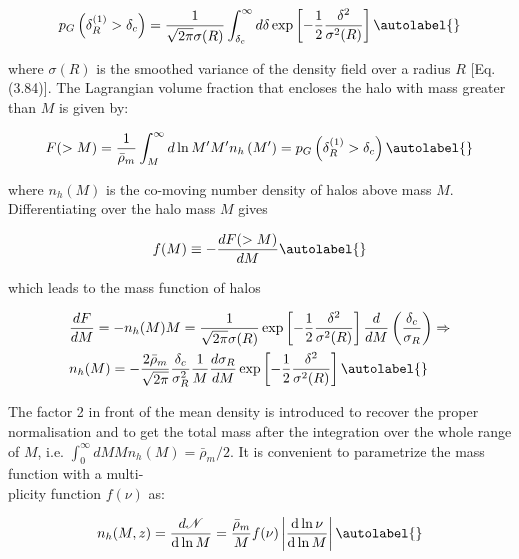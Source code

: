 \begin{equation}
    p_{G}\left(\delta_{R}^{(1)}>\delta_{c}\right)=\frac{1}{\sqrt{2 \pi} \sigma(R)} \int_{\delta_{c}}^{\infty} d \delta \exp \left[-\frac{1}{2} \frac{\delta^{2}}{\sigma^{2}(R)}\right] \autolabel{}
\end{equation}


where $\sigma(R)$ is the smoothed variance of the density field over a radius $R$ [Eq.(3.84)]. The Lagrangian volume fraction that encloses the halo with mass greater than $M$ is given by:


\begin{equation}
    F(>M)=\frac{1}{\bar{\rho}_{m}} \int_{M}^{\infty} d \ln M^{\prime} M^{\prime} n_{h}\left(M^{\prime}\right)=p_{G}\left(\delta_{R}^{(1)}>\delta_{c}\right) \autolabel{}
\end{equation}


where $n_{h}(M)$ is the co-moving number density of halos above mass $M$. Differentiating over the halo mass $M$ gives


\begin{equation}
    f(M) \equiv-\frac{d F(>M)}{d M} \autolabel{}
\end{equation}


which leads to the mass function of halos


\begin{align*}
    & \frac{d F}{d M}=-n_{h}(M) M=\frac{1}{\sqrt{2 \pi} \sigma(R)} \exp \left[-\frac{1}{2} \frac{\delta^{2}}{\sigma^{2}(R)}\right] \frac{d}{d M}\left(\frac{\delta_{c}}{\sigma_{R}}\right) \Rightarrow \\
    & n_{h}(M)=-\frac{2 \bar{\rho}_{m}}{\sqrt{2 \pi}} \frac{\delta_{c}}{\sigma_{R}^{2}} \frac{1}{M} \frac{d \sigma_{R}}{d M} \exp \left[-\frac{1}{2} \frac{\delta^{2}}{\sigma^{2}(R)}\right] \autolabel{}
\end{align*}


The factor 2 in front of the mean density is introduced to recover the proper normalisation and to get the total mass after the integration over the whole range of $M$, i.e. $\int_{0}^{\infty} d M M n_{h}(M)=\bar{\rho}_{m} / 2$. It is convenient to parametrize the mass function with a multi-\\
plicity function $f(\nu)$ as:


\begin{equation}
    n_{h}(M, z)=\frac{d \mathcal{N}}{\mathrm{d} \ln M}=\frac{\bar{\rho}_{m}}{M} f(\nu)\left|\frac{\mathrm{d} \ln \nu}{\mathrm{d} \ln M}\right| \autolabel{}
\end{equation}


